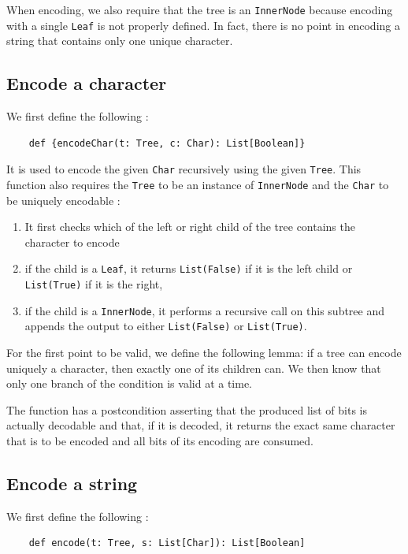 \documentclass[a4paper,UKenglish,cleveref, autoref, thm-restate]{lipics-v2021}
\begin{document}
When encoding, we also require that the tree is an \lstinline{InnerNode} because encoding with a single \lstinline{Leaf} is not properly defined. In fact, there is no point in encoding a string that contains only one unique character.

\subsection{Encode a character}
We first define the following :

\begin{lstlisting}
    def {encodeChar(t: Tree, c: Char): List[Boolean]} 
\end{lstlisting}

It is used to encode the given \lstinline{Char} recursively using the given \lstinline{Tree}. This function also requires the \lstinline{Tree} to be an instance of \lstinline{InnerNode} 
and the \lstinline{Char} to be uniquely encodable :

\begin{enumerate}
    \item It first checks which of the left or right child of the tree contains the character to encode
    \item if the child is a \lstinline{Leaf}, it returns \lstinline{List(False)} if it is the left child or \lstinline{List(True)} if it is the right,
    \item if the child is a \lstinline{InnerNode}, it performs a recursive call on this subtree and appends the output to either \lstinline{List(False)} or \lstinline{List(True)}.
\end{enumerate}

For the first point to be valid, we define the following lemma: if a tree can encode uniquely a character, then exactly one of its children can. We then know that only one branch of the condition is valid at a time.

The function has a postcondition asserting that the produced list of bits is actually decodable and that, if it is decoded, it returns the exact same character that is to be encoded and all bits of its encoding are consumed.

\subsection{Encode a string}
We first define the following :

\begin{lstlisting}
    def encode(t: Tree, s: List[Char]): List[Boolean]
\end{lstlisting}
\end{document}
